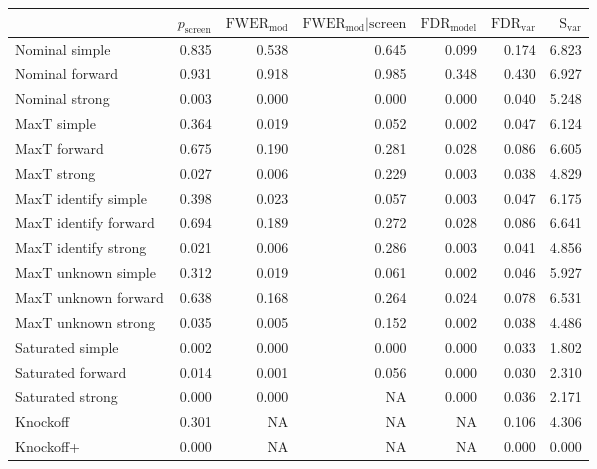 
\newcommand{\guarantee}[1]{{\color{blue} #1}}
\begin{tabular}{|l|rrrrrr|}
 \hline
{} &  $p_{\text{screen}}$ &  $\text{FWER}_{\text{mod}}$ &  $\text{FWER}_{\text{mod}} \vert \text{screen}$ &  $\text{FDR}_{\text{model}}$ &  $\text{FDR}_{\text{var}}$ &  $\text{S}_{\text{var}}$ \\ \hline
Nominal simple & 0.835 & 0.538 & 0.645 & 0.099 & 0.174 & 6.823 \\ 
Nominal forward & 0.931 & 0.918 & 0.985 & 0.348 & 0.430 & 6.927 \\ 
Nominal strong & 0.003 & 0.000 & 0.000 & 0.000 & 0.040 & 5.248 \\ 
MaxT simple & 0.364 & \guarantee{0.019} & \guarantee{0.052} & \guarantee{0.002} & 0.047 & 6.124 \\ 
MaxT forward & 0.675 & 0.190 & 0.281 & \guarantee{0.028} & 0.086 & 6.605 \\ 
MaxT strong & 0.027 & \guarantee{0.006} & 0.229 & \guarantee{0.003} & 0.038 & 4.829 \\ 
MaxT identify simple & 0.398 & \guarantee{0.023} & \guarantee{0.057} & \guarantee{0.003} & 0.047 & 6.175 \\ 
MaxT identify forward & 0.694 & 0.189 & 0.272 & \guarantee{0.028} & 0.086 & 6.641 \\ 
MaxT identify strong & 0.021 & \guarantee{0.006} & 0.286 & \guarantee{0.003} & 0.041 & 4.856 \\ 
MaxT unknown simple & 0.312 & \guarantee{0.019} & \guarantee{0.061} & \guarantee{0.002} & 0.046 & 5.927 \\ 
MaxT unknown forward & 0.638 & 0.168 & 0.264 & \guarantee{0.024} & 0.078 & 6.531 \\ 
MaxT unknown strong & 0.035 & \guarantee{0.005} & 0.152 & \guarantee{0.002} & 0.038 & 4.486 \\ 
Saturated simple & 0.002 & 0.000 & 0.000 & 0.000 & 0.033 & 1.802 \\ 
Saturated forward & 0.014 & 0.001 & 0.056 & 0.000 & 0.030 & 2.310 \\ 
Saturated strong & 0.000 & 0.000 & NA & 0.000 & 0.036 & 2.171 \\ 
Knockoff & 0.301 & NA & NA & NA & 0.106 & 4.306 \\ 
Knockoff+ & 0.000 & NA & NA & NA & \guarantee{0.000} & 0.000 \\   \hline
\end{tabular}